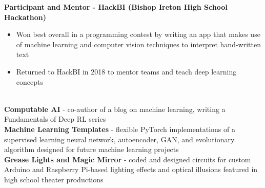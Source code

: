 \documentclass{article}
\begin{document}
\begin{center}
\begin{flushleft}
    \textbf{Participant and Mentor - HackBI  (Bishop Ireton High School Hackathon)}
    \begin{itemize}
      \itemsep0em
      \item Won best overall in a programming contest by writing an app that makes use of machine learning and computer vision techniques to interpret hand-written text
      \item Returned to HackBI in 2018 to mentor teams and teach deep learning concepts
    \end{itemize}


    {\large\textbf{\underline{}}} \\
    \textbf{Computable AI} - co-author of a blog on machine learning, writing a Fundamentals of Deep RL series \\
    \textbf{Machine Learning Templates} - flexible PyTorch implementations of a supervised learning neural network, autoencoder, GAN, and evolutionary algorithm designed for future machine learning projects \\
    \textbf{Grease Lights and Magic Mirror} - coded and designed circuits for custom Arduino and Raspberry Pi-based lighting effects and optical illusions featured in high school theater productions

  \end{flushleft}
  \end{center}
\end{document}
